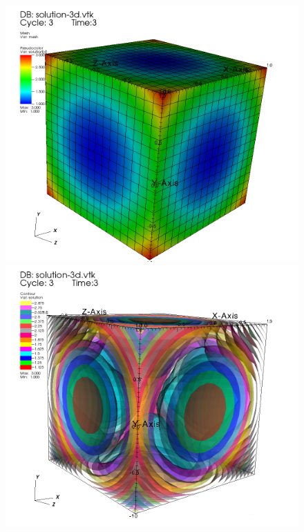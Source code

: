 \documentclass[11pt,fullpage]{article}
\theoremstyle{lemma}
\theoremstyle{definition}
\theoremstyle{lemma}
\begin{document}
\begin{figure}[!ht]
	\begin{minipage}{.4\paperwidth}
		\centering
		\includegraphics[scale=.7]{Step4-3d.png}
	\end{minipage}%
	\begin{minipage}{.4\paperwidth}
		\centering
		\includegraphics[scale=.7]{Step4-3dcon.png}
	\end{minipage}
\end{figure}
\clearpage
\end{document}
